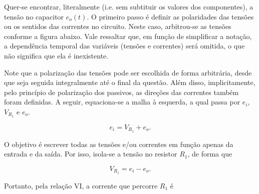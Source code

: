 \documentclass{article}
\numberwithin{equation}{section}
\begin{document}
\begin{center}
\end{center}

\noindent Quer-se encontrar, literalmente (i.e. sem subtituir os valores dos componentes), a tensão no capacitor $e_o(t)$. O primeiro passo é definir as polaridades das tensões ou os sentidos das correntes no circuito. Neste caso, arbitrou-se as tensões conforme a figura abaixo. Vale ressaltar que, em função de simplificar a notação, a dependência temporal das variáveis (tensões e correntes) será omitida, o que não significa que ela é inexistente.

\begin{center}
\end{center}

\noindent Note que a polarização das tensões pode ser escolhida de forma arbitrária, desde que seja seguida integralmente até o final da questão. Além disso, implicitamente, pelo princípio de polarização dos passivos, as direções das correntes também foram definidas. A seguir, equaciona-se a malha à esquerda, a qual passa por $e_i$, $V_{R_1}$ e $e_o$.

\begin{equation*}
    e_{i} = V_{R_{1}} + e_{o}.
\end{equation*}

\noindent O objetivo é escrever todas as tensões e/ou correntes em função apenas da entrada e da saída. Por isso, isola-se a tensão no resistor $R_1$, de forma que

\begin{equation*}
    V_{R_{1}} = e_{i} - e_{o}.
\end{equation*}

\noindent Portanto, pela relação VI, a corrente que percorre $R_1$ é
\end{document}
